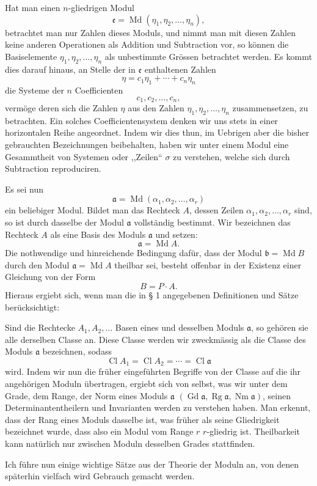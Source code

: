 \documentclass[11pt,a4paper]{article}
\newcommand{\Cl}{\operatorname{Cl}}
\newcommand{\Md}{\operatorname{Md}}
\newcommand{\Nm}{\operatorname{Nm}}
\newcommand{\Rg}{\operatorname{Rg}}
\newcommand{\Gd}{\operatorname{Gd}}
\begin{document}
Hat man einen $n$-gliedrigen Modul
\[
 \mathfrak e=\Md(\eta_1,\eta_2,\ldots,\eta_n),
\]
betrachtet man nur Zahlen dieses Moduls, und nimmt man mit diesen Zahlen keine anderen Operationen als Addition und Subtraction vor, so können die Basiselemente $\eta_1,\eta_2,\ldots,\eta_n$ als unbestimmte Grössen betrachtet werden. Es kommt dies darauf hinaus, an Stelle der in $\mathfrak e$ enthaltenen Zahlen
\[
 \eta=c_1\eta_1+\cdots+c_n\eta_n
\]
die Systeme der $n$ Coefficienten
\[
 c_1,c_2,\ldots,c_n,
\]
vermöge deren sich die Zahlen $\eta$ aus den Zahlen $\eta_1,\eta_2,\ldots,\eta_n$ zusammensetzen, zu betrachten. Ein solches Coefficientensystem denken wir uns stets in einer horizontalen Reihe angeordnet. Indem wir dies thun, im Uebrigen aber die bisher gebrauchten Bezeichnungen beibehalten, haben wir unter einem Modul eine Gesammtheit von Systemen oder ,,Zeilen`` $\sigma$ zu verstehen, welche sich durch Subtraction reproduciren.

Es sei nun
\[
 \mathfrak a=\Md(\alpha_1,\alpha_2,\ldots,\alpha_r)
\]
ein beliebiger Modul. Bildet man das Rechteck $A$, dessen Zeilen $\alpha_1,\alpha_2,\ldots,\alpha_r$ sind, so ist durch dasselbe der Modul $\mathfrak a$ vollständig bestimmt. Wir bezeichnen das Rechteck $A$ als eine Basis des Moduls $\mathfrak a$ und setzen:
\[
 \mathfrak a=\Md A.
\]
Die nothwendige und hinreichende Bedingung dafür, dass der Modul $\mathfrak b=\Md B$ durch den Modul $\mathfrak a=\Md A$ theilbar sei, besteht offenbar in der Existenz einer Gleichung von der Form
\[
 B=P\cdot A.
\]
Hieraus ergiebt sich, wenn man die in § 1 angegebenen Definitionen und Sätze berücksichtigt:

Sind die Rechtecke $A_1,A_2,\ldots$ Basen eines und desselben Moduls $\mathfrak a$, so gehören sie alle derselben Classe an. Diese Classe werden wir zweckmässig als die Classe des Moduls $\mathfrak a$ bezeichnen, sodass
\[
 \Cl A_1=\Cl A_2=\cdots=\Cl\mathfrak a
\]
wird. Indem wir nun die früher eingeführten Begriffe von der Classe auf die ihr angehörigen Moduln übertragen, ergiebt sich von selbst, was wir unter dem Grade, dem Range, der Norm eines Moduls $\mathfrak a$ $(\Gd\mathfrak a,\Rg\mathfrak a,\Nm\mathfrak a)$, seinen Determinantentheilern und Invarianten werden zu verstehen haben. Man erkennt, dass der Rang eines Moduls dasselbe ist, was früher als seine Gliedrigkeit bezeichnet wurde, dass also ein Modul vom Range $r$ $r$-gliedrig ist. Theilbarkeit kann natürlich nur zwischen Moduln desselben Grades stattfinden.

Ich führe nun einige wichtige Sätze aus der Theorie der Moduln an, von denen späterhin vielfach wird Gebrauch gemacht werden.
\end{document}
